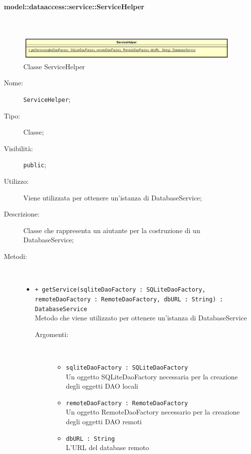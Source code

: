 \documentclass[../DefinizioneDiProdotto.tex]{subfiles}
\begin{document}
\paragraph{model::dataaccess::service::ServiceHelper}
\
\begin{figure}[H]
	\centering
	\includegraphics[width=\maxwidth]{img/ServiceHelper.png}
	\caption{Classe ServiceHelper}\label{fig:model::dataaccess::service::ServiceHelper} 
\end{figure}
\begin{description}
	\item[Nome:] \texttt{ServiceHelper};
	\item[Tipo:] Classe;
	\item[Visibilità:] \texttt{public};
	\item[Utilizzo:] Viene utilizzata per ottenere un'istanza di DatabaseService;
	\item[Descrizione:] Classe che rappresenta un aiutante per la costruzione di un DatabaseService;
	\item[Metodi:] \
	\begin{itemize}
		\item \texttt{+ getService(sqliteDaoFactory : SQLiteDaoFactory, remoteDaoFactory : RemoteDaoFactory, dbURL : String) : DatabaseService}\\
		Metodo che viene utilizzato per ottenere un'istanza di DatabaseService
		\begin{description}
			\item[Argomenti:] \
			\begin{itemize}
				\item \texttt{sqliteDaoFactory : SQLiteDaoFactory}\\
				Un oggetto SQLiteDaoFactory necessaria per la creazione degli oggetti DAO locali\item \texttt{remoteDaoFactory : RemoteDaoFactory}\\
				Un oggetto RemoteDaoFactory necessario per la creazione degli oggetti DAO remoti\item \texttt{dbURL : String}\\
				L'URL del database remoto\end{itemize}
		\end{description}
	\end{itemize}
\end{description}
\end{document}
